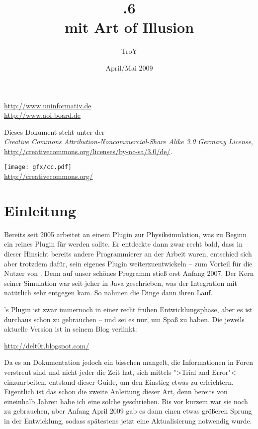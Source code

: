 \documentclass[10pt,DIV=14,a4paper]{scrartcl}
\begin{document}
\author{TroY}
\title{.6 \\ mit Art of Illusion}
\date{April/Mai 2009}
\maketitle
\thispagestyle{empty}

\vspace{120mm}

\begin{center}
	\url{http://www.uninformativ.de} \\
	\url{http://www.aoi-board.de}

	Dieses Dokument steht unter der \\
	\textit{Creative Commons Attribution-Noncommercial-Share Alike 3.0 Germany License}, \\
	\url{http://creativecommons.org/licenses/by-nc-sa/3.0/de/}.

	\texttt{[image: gfx/cc.pdf]} \\
	\url{http://creativecommons.org/}
\end{center}

\pagebreak

\tableofcontents
\thispagestyle{empty}
\pagebreak


\section{Einleitung}

Bereits seit 2005 arbeitet \deltor an einem Plugin zur Physiksimulation,
was zu Beginn ein reines Plugin für \blender werden sollte. Er entdeckte
dann zwar recht bald, dass in dieser Hinsicht bereits andere
Programmierer an der Arbeit waren, entschied sich aber trotzdem dafür,
sein eigenes Plugin weiterzuentwickeln -- zum Vorteil für die Nutzer von
\aoi. Denn auf unser schönes Programm stieß \deltor erst Anfang 2007.
Der Kern seiner Simulation war seit jeher in Java geschrieben, was der
Integration mit \aoi natürlich sehr entgegen kam. So nahmen die Dinge
dann ihren Lauf.

\deltor's Plugin ist zwar immernoch in einer recht frühen
Entwicklungsphase, aber es ist durchaus schon zu gebrauchen -- und sei
es nur, um Spaß zu haben. Die jeweils aktuelle Version ist in seinem
Blog verlinkt:

\url{http://delt0r.blogspot.com/}

Da es an Dokumentation jedoch ein bisschen mangelt, die Informationen in
Foren verstreut sind und nicht jeder die Zeit hat, sich mittels ">Trial
and Error"< einzuarbeiten, entstand dieser Guide, um den Einstieg etwas
zu erleichtern. Eigentlich ist das schon die zweite Anleitung dieser
Art, denn bereits von eineinhalb Jahren habe ich eine solche
geschrieben. Bis vor kurzem war sie noch zu gebrauchen, aber Anfang
April 2009 gab es dann einen etwas größeren Sprung in der Entwicklung,
sodass spätestens jetzt eine Aktualisierung notwendig wurde.
\end{document}
